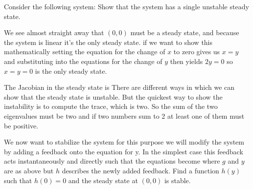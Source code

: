 Consider the following system:
\subquestion 
Show that the system has a single unstable steady state.

\solution  
We see almost straight away that $(0,0)$ must be a steady state, and because the system is linear it's the only steady state. if we want to show this mathematically setting the equation for the change of $x$ to zero gives us $x=y$ and substituting into the equations for the change of $y$ then yields $2y=0$ so $x=y=0$ is the only steady state. 

The Jacobian in the steady state is 
There are different ways in which we can show that the steady state is unstable. But the quickest way to show the instability is to compute the trace, which is two. So the sum of the two eigenvalues must be two and if two numbers sum to 2 at least one of them must be positive. 

\subquestion 
We now want to stabilize the system for this purpose we will modify the system by adding a feedback onto the equation for y. In the simplest case this feedback acts instantaneously and directly such that the equations become
where $g$ and $y$ are as above but $h$ describes the newly added feedback. Find a function $h(y)$ such that $h(0)=0$ and the steady state at $(0,0)$ is stable. 

